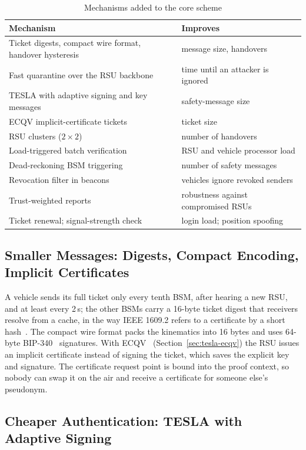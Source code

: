 \begin{table}[htbp]\centering\small
\caption{Mechanisms added to the core scheme}\label{tab:mechanisms}
\begin{tabular}{@{}ll@{}}
\toprule
Mechanism & Improves \\
\midrule
Ticket digests, compact wire format, handover hysteresis & message size, handovers \\
Fast quarantine over the RSU backbone & time until an attacker is ignored \\
TESLA with adaptive signing and key messages & safety-message size \\
ECQV implicit-certificate tickets & ticket size \\
RSU clusters ($2\times2$) & number of handovers \\
Load-triggered batch verification & RSU and vehicle processor load \\
Dead-reckoning BSM triggering & number of safety messages \\
Revocation filter in beacons & vehicles ignore revoked senders \\
Trust-weighted reports & robustness against compromised RSUs \\
Ticket renewal; signal-strength check & login load; position spoofing \\
\bottomrule
\end{tabular}
\end{table}

\subsection{Smaller Messages: Digests, Compact Encoding, Implicit Certificates}

A vehicle sends its full ticket only every tenth BSM, after hearing a new RSU, and at least every
2\,s; the other BSMs carry a 16-byte ticket digest that receivers resolve from a cache, in the way
IEEE 1609.2 refers to a certificate by a short hash~\cite{ieee16092}. The compact
wire format packs the kinematics into 16 bytes and uses 64-byte BIP-340~\cite{bip340} signatures. With ECQV~\cite{sec4ecqv}
(Section~\ref{sec:tesla-ecqv}) the RSU issues an implicit certificate instead of signing the ticket, which saves the
explicit key and signature. The certificate request point is bound into the proof context, so nobody
can swap it on the air and receive a certificate for someone else's pseudonym.

\subsection{Cheaper Authentication: TESLA with Adaptive Signing}

